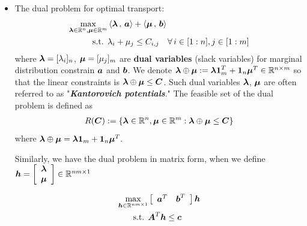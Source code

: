 \documentclass[11pt]{article}
\begin{document}
\begin{itemize}
\item The dual problem for optimal transport: 
\begin{align}
\max_{\boldsymbol{\lambda} \in {\mathbb R}^{n}, \boldsymbol{\mu} \in {\mathbb R}^{m}} & \left\langle \boldsymbol{\lambda}\,,\, \boldsymbol{a} \right\rangle + \left\langle \boldsymbol{\mu}\,,\, \boldsymbol{b} \right\rangle \label{eqn: optimal_transport_dual}\\
\text{s.t. } & \lambda_i + \mu_{j} \le C_{i,j}\quad \forall\, i\in [1:n], j\in [1:m] \nonumber
\end{align} where $\boldsymbol{\lambda}= [\lambda_i]_{n}$, $\boldsymbol{\mu}= [\mu_{j}]_{m}$ are \textbf{dual variables} (slack variables) for marginal distribution constrain $\boldsymbol{a}$ and $\boldsymbol{b}$. We denote $\boldsymbol{\lambda}\oplus \boldsymbol{\mu}:= \boldsymbol{\lambda}\boldsymbol{1}_{m}^{T} + \boldsymbol{1}_{n}\boldsymbol{\mu}^{T} \in {\mathbb R}^{n\times m}$ so that the linear constraints is $\boldsymbol{\lambda}\oplus \boldsymbol{\mu} \le \boldsymbol{C}$. Such dual variables $\boldsymbol{\lambda}$, $\boldsymbol{\mu}$ are often referred to as "\emph{\textbf{Kantorovich potentials}}."  The feasible set of the dual problem is defined as 
\begin{align}
R(\boldsymbol{C}) := \left\{\boldsymbol{\lambda} \in {\mathbb R}^{n}, \boldsymbol{\mu} \in {\mathbb R}^{m}: \boldsymbol{\lambda}\oplus \boldsymbol{\mu} \le \boldsymbol{C}\right\} \label{eqn: optimal_transport_dual_feasible_set}
\end{align} where $\boldsymbol{\lambda}\oplus \boldsymbol{\mu} = \boldsymbol{\lambda}\boldsymbol{1}_{m} + \boldsymbol{1}_n \boldsymbol{\mu}^{T}.$

Similarly, we have the dual problem in matrix form, when we define $\boldsymbol{h} = \left[
\begin{array}{c}
\boldsymbol{\lambda} \\
\boldsymbol{\mu}
\end{array}\right] \in {\mathbb R}^{nm \times 1}$

\begin{align}
\max_{\boldsymbol{h} \in {\mathbb R}^{nm \times 1}} & \left[
\begin{array}{cc}
\boldsymbol{a}^{T} & \boldsymbol{b}^{T}
\end{array}\right]  \boldsymbol{h} \label{eqn: optimal_transport_dual_mat}\\
\text{s.t. }&  \boldsymbol{A}^{T}\boldsymbol{h} \le \boldsymbol{c} \nonumber
\end{align}
\end{itemize}
\end{document}
